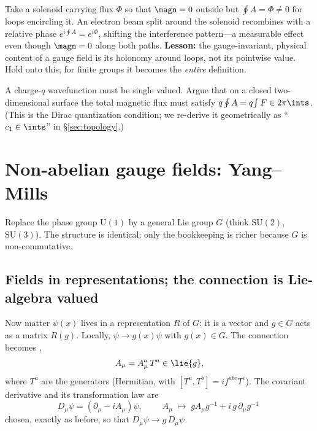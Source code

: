 \documentclass[11pt]{article}
\newcommand{\Uone}{\mathrm{U}(1)}
\begin{document}
\begin{eexample}
Take a solenoid carrying flux $\Phi$ so that $\magn=0$ outside but $\oint A = \Phi
\neq 0$ for loops encircling it. An electron beam split around the solenoid recombines
with a relative phase $e^{i\oint A}=e^{i\Phi}$, shifting the interference pattern---a
measurable effect even though $\magn=0$ along both paths. \textbf{Lesson:} the
gauge-invariant, physical content of a gauge field is its holonomy around loops, not
its pointwise value. Hold onto this; for finite groups it becomes the \emph{entire}
definition.
\end{eexample}

\begin{xca}
A charge-$q$ wavefunction must be single valued. Argue that on a closed
two-dimensional surface the total magnetic flux must satisfy
$q\oint A = q\!\int F \in 2\pi\ints$. (This is the Dirac quantization condition; we
re-derive it geometrically as ``$c_1 \in \ints$'' in \S\ref{sec:topology}.)
\end{xca}

\section{Non-abelian gauge fields: Yang--Mills}

Replace the phase group $\Uone$ by a general Lie group $G$ (think $\mathrm{SU}(2)$,
$\mathrm{SU}(3)$). The structure is identical; only the bookkeeping is richer because
$G$ is non-commutative.

\subsection{Fields in representations; the connection is Lie-algebra valued}

Now matter $\psi(x)$ lives in a representation $R$ of $G$: it is a vector and $g\in G$
acts as a matrix $R(g)$. Locally, $\psi \to g(x)\psi$ with $g(x)\in G$. The connection
becomes ,
\[
A_\mu = A_\mu^a\, T^a \in \lie{g},
\]
where $T^a$ are the generators (Hermitian, with $[T^a,T^b]=if^{abc}T^c$). The
covariant derivative and its transformation law are
\[
D_\mu\psi = (\partial_\mu - iA_\mu)\psi, \qquad
\boxed{\;A_\mu \;\longmapsto\; g A_\mu g^{-1} + i\,g\,\partial_\mu g^{-1}\;}
\]
chosen, exactly as before, so that $D_\mu\psi \to g\,D_\mu\psi$.
\end{document}
